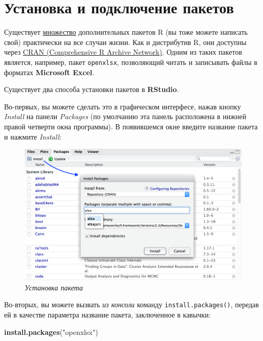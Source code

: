 \documentclass[]{book}
\newenvironment{Shaded}{\begin{snugshade}}{\end{snugshade}}
\newcommand{\KeywordTok}[1]{\textcolor[rgb]{0.13,0.29,0.53}{\textbf{#1}}}
\newcommand{\StringTok}[1]{\textcolor[rgb]{0.31,0.60,0.02}{#1}}
\newcommand{\NormalTok}[1]{#1}
\begin{document}
\section*{Установка и подключение пакетов}\label{---}

Существует \href{https://cran.r-project.org/web/packages/}{множество}
дополнительных пакетов R (вы тоже можете написать свой) практически на
все случаи жизни. Как и дистрибутив R, они доступны через
\href{https://cran.r-project.org}{CRAN (Comprehensive R Archive
Network)}. Одним из таких пакетов является, например, пакет
\texttt{openxlsx}, позволяющий читать и записывать файлы в форматах
\textbf{Microsoft Excel}.

Существует два способа установки пакетов в \textbf{RStudio}.

Во-первых, вы можете сделать это в графическом интерфесе, нажав кнопку
\emph{Install} на панели \emph{Packages} (по умолчанию эта панель
расположена в нижней правой четверти окна программы). В появившемся окне
введите название пакета и нажмите \emph{Install}:

\begin{figure}
\centering
\includegraphics{images/InstallPackages.png}
\caption{\emph{Установка пакета}}
\end{figure}

Во-вторых, вы можете вызвать \emph{из консоли} команду
\texttt{install.packages()}, передав ей в качестве параметра название
пакета, заключенное в кавычки:

\begin{Shaded}
\begin{Highlighting}[]
\KeywordTok{install.packages}\NormalTok{(}\StringTok{"openxlsx"}\NormalTok{)}
\end{Highlighting}
\end{Shaded}
\end{document}
